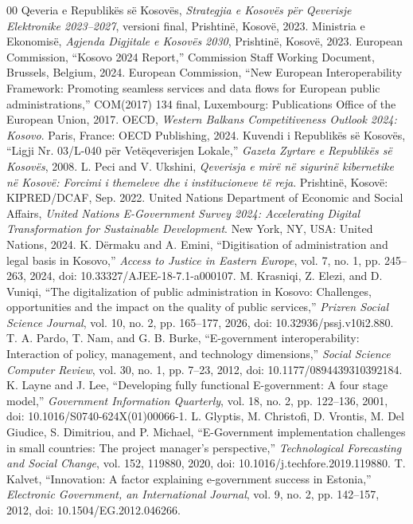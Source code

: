 \documentclass[conference]{IEEEtran}
\begin{document}
\begin{thebibliography}{00}
 Qeveria e Republikës së Kosovës, \emph{Strategjia e Kosovës për Qeverisje Elektronike 2023--2027}, versioni final, Prishtinë, Kosovë, 2023.
 Ministria e Ekonomisë, \emph{Agjenda Digjitale e Kosovës 2030}, Prishtinë, Kosovë, 2023.
 European Commission, ``Kosovo 2024 Report,'' Commission Staff Working Document, Brussels, Belgium, 2024.
 European Commission, ``New European Interoperability Framework: Promoting seamless services and data flows for European public administrations,'' COM(2017) 134 final, Luxembourg: Publications Office of the European Union, 2017.
 OECD, \emph{Western Balkans Competitiveness Outlook 2024: Kosovo}. Paris, France: OECD Publishing, 2024.
 Kuvendi i Republikës së Kosovës, ``Ligji Nr. 03/L-040 për Vetëqeverisjen Lokale,'' \emph{Gazeta Zyrtare e Republikës së Kosovës}, 2008.
 L. Peci and V. Ukshini, \emph{Qeverisja e mirë në sigurinë kibernetike në Kosovë: Forcimi i themeleve dhe i institucioneve të reja}. Prishtinë, Kosovë: KIPRED/DCAF, Sep. 2022.
 United Nations Department of Economic and Social Affairs, \emph{United Nations E-Government Survey 2024: Accelerating Digital Transformation for Sustainable Development}. New York, NY, USA: United Nations, 2024.
 K. Dërmaku and A. Emini, ``Digitisation of administration and legal basis in Kosovo,'' \emph{Access to Justice in Eastern Europe}, vol. 7, no. 1, pp. 245--263, 2024, doi: 10.33327/AJEE-18-7.1-a000107.
 M. Krasniqi, Z. Elezi, and D. Vuniqi, ``The digitalization of public administration in Kosovo: Challenges, opportunities and the impact on the quality of public services,'' \emph{Prizren Social Science Journal}, vol. 10, no. 2, pp. 165--177, 2026, doi: 10.32936/pssj.v10i2.880.
 T. A. Pardo, T. Nam, and G. B. Burke, ``E-government interoperability: Interaction of policy, management, and technology dimensions,'' \emph{Social Science Computer Review}, vol. 30, no. 1, pp. 7--23, 2012, doi: 10.1177/0894439310392184.
 K. Layne and J. Lee, ``Developing fully functional E-government: A four stage model,'' \emph{Government Information Quarterly}, vol. 18, no. 2, pp. 122--136, 2001, doi: 10.1016/S0740-624X(01)00066-1.
 L. Glyptis, M. Christofi, D. Vrontis, M. Del Giudice, S. Dimitriou, and P. Michael, ``E-Government implementation challenges in small countries: The project manager's perspective,'' \emph{Technological Forecasting and Social Change}, vol. 152, 119880, 2020, doi: 10.1016/j.techfore.2019.119880.
 T. Kalvet, ``Innovation: A factor explaining e-government success in Estonia,'' \emph{Electronic Government, an International Journal}, vol. 9, no. 2, pp. 142--157, 2012, doi: 10.1504/EG.2012.046266.
\end{thebibliography}
\end{document}
